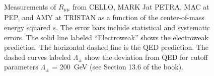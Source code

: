 \documentclass[a4paper,10pt]{article}
\begin{document}
\begin{figure}[htb]
\begin{center}
\caption{Measurements of $R_{\mu\mu}$ from CELLO, MARK Jat PETRA,
MAC at PEP, and AMY at TRISTAN as a function of the
center-of-mass energy squared $s$. The error bars include statistical and systematic errors.
The solid line labeled ``Electroweak'' shows the electroweak prediction. The horizontal dashed line
is the QED prediction.
The dashed curves labeled $\Lambda_\pm$ show the deviation from QED for cutoff parameters $\Lambda_\pm$ = 200~GeV
(see Section 13.6 of the book). }
\end{center}
\end{figure}
%
\vskip 5cm
\doclicenseThis
\end{document}
